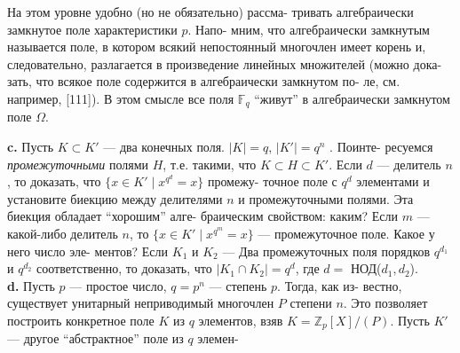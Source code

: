 \begin{mynotice}
На этом уровне удобно (но не обязательно) рассма-\linebreak
тривать алгебраически замкнутое поле характеристики $p$. Напо-\linebreak
мним, что алгебраически замкнутым называется поле, в котором\linebreak
всякий непостоянный многочлен имеет корень и, следовательно,\linebreak
разлагается в произведение линейных множителей (можно дока-\linebreak
зать, что всякое поле содержится в алгебраически замкнутом по-\linebreak
ле, см. например, [111]). В этом смысле все поля $\mathbb{F}_q$ “живут” в\linebreak
алгебраически замкнутом поле  $\Omega$.
\end{mynotice}
\hspace*{10pt}\textbf{c.} Пусть $K\subset K'$ — два конечных поля. $|K|=q$, $|K'| = q^n$ . Поинте-\linebreak
ресуемся \textit{промежуточными} полями $H$, т.е. такими, что $K\subset H\subset K'$.\linebreak
Если $d$ — делитель $n$, то доказать, что $\{x\in K'\;|\;x^{q^d}=x\}$ промежу-\linebreak
точное поле с $q^d$ элементами и установите биекцию между делителями\linebreak
$n$ и промежуточными полями. Эта биекция обладает “хорошим” алге-\linebreak
браическим свойством: каким? Если $m$ — какой-либо делитель $n$, то\linebreak
$\{x\in K'\;|\;x^{q^m}=x\}$ — промежуточное поле. Какое у него число эле-\linebreak
ментов? Если $K_1$ и $K_2$ — Два промежуточных поля порядков $q^{d_1}$ и $q^{d_2}$\linebreak
соответственно, то доказать, что $|K_1\cap K_2| = q^d$, где $d =$ НОД($d_1,d_2$).
\\
\hspace*{10pt}\textbf{d.} Пусть $p$ — простое число, $q = p^n$ — степень $p$. Тогда, как из-\linebreak
вестно, существует унитарный неприводимый многочлен $P$ степени\linebreak
$n$. Это позволяет построить конкретное поле $K$ из $q$ элементов, взяв\linebreak
$K=\mathbb{Z}_p[X]/(P)$. Пусть $K'$ — другое “абстрактное” поле из $q$ элемен-\linebreak
